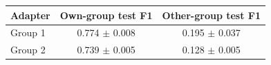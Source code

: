 \begin{tabular}{lcc}
\toprule
\textbf{Adapter} & \textbf{Own-group test F1} & \textbf{Other-group test F1} \\
\midrule
Group 1 & 0.774 $\pm$ 0.008 & 0.195 $\pm$ 0.037 \\
Group 2 & 0.739 $\pm$ 0.005 & 0.128 $\pm$ 0.005 \\
\bottomrule
\end{tabular}
